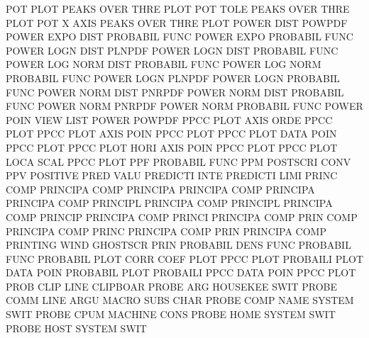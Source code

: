 POT      PLOT                           PEAKS    OVER THRE PLOT
POT      TOLE                           PEAKS    OVER THRE PLOT
POT      X    AXIS                      PEAKS    OVER THRE PLOT
POWER    DIST                           POWPDF
POWER    EXPO DIST                      PROBABIL FUNC
POWER    EXPO                           PROBABIL FUNC
POWER    LOGN DIST                      PLNPDF
POWER    LOGN DIST                      PROBABIL FUNC
POWER    LOG  NORM DIST                 PROBABIL FUNC
POWER    LOG  NORM                      PROBABIL FUNC
POWER    LOGN                           PLNPDF
POWER    LOGN                           PROBABIL FUNC
POWER    NORM DIST                      PNRPDF
POWER    NORM DIST                      PROBABIL FUNC
POWER    NORM                           PNRPDF
POWER    NORM                           PROBABIL FUNC
POWER    POIN VIEW                      LIST
POWER                                   POWPDF
PPCC     PLOT AXIS ORDE                 PPCC     PLOT
PPCC     PLOT AXIS POIN                 PPCC     PLOT
PPCC     PLOT DATA POIN                 PPCC     PLOT
PPCC     PLOT HORI AXIS POIN            PPCC     PLOT
PPCC     PLOT LOCA SCAL                 PPCC     PLOT
PPF                                     PROBABIL FUNC
PPM                                     POSTSCRI CONV
PPV                                     POSITIVE PRED VALU
PREDICTI INTE                           PREDICTI LIMI
PRINC    COMP                           PRINCIPA COMP
PRINCIPA                                PRINCIPA COMP
PRINCIPA                                PRINCIPA COMP
PRINCIPL                                PRINCIPA COMP
PRINCIPL                                PRINCIPA COMP
PRINCIP                                 PRINCIPA COMP
PRINCI                                  PRINCIPA COMP
PRIN     COMP                           PRINCIPA COMP
PRINC                                   PRINCIPA COMP
PRIN                                    PRINCIPA COMP
PRINTING WIND                           GHOSTSCR PRIN
PROBABIL DENS FUNC                      PROBABIL FUNC
PROBABIL PLOT CORR COEF PLOT            PPCC     PLOT
PROBAILI PLOT DATA POIN                 PROBABIL PLOT
PROBAILI PPCC DATA POIN                 PPCC     PLOT
PROB     CLIP LINE                      CLIPBOAR
PROBE    ARG                            HOUSEKEE SWIT
PROBE    COMM LINE ARGU                 MACRO    SUBS CHAR
PROBE    COMP NAME                      SYSTEM   SWIT
PROBE    CPUM                           MACHINE  CONS
PROBE    HOME                           SYSTEM   SWIT
PROBE    HOST                           SYSTEM   SWIT
